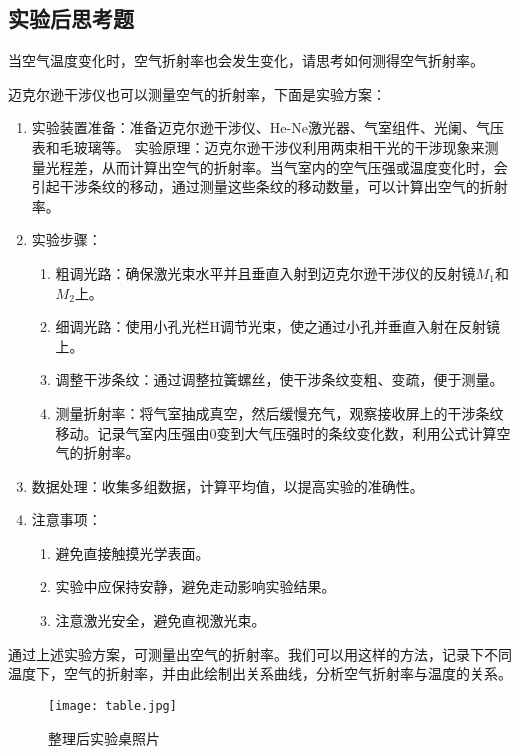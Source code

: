 \documentclass[dvipsnames, svgnames,a4paper,11pt]{article}
\begin{document}
			
			
			
\subsection{实验后思考题}



\begin{question}
	当空气温度变化时，空气折射率也会发生变化，请思考如何测得空气折射率。
\end{question}
	
	迈克尔逊干涉仪也可以测量空气的折射率，下面是实验方案：
	
	\begin{enumerate}
		\item 实验装置准备：准备迈克尔逊干涉仪、He-Ne激光器、气室组件、光阑、气压表和毛玻璃等。
		实验原理：迈克尔逊干涉仪利用两束相干光的干涉现象来测量光程差，从而计算出空气的折射率。当气室内的空气压强或温度变化时，会引起干涉条纹的移动，通过测量这些条纹的移动数量，可以计算出空气的折射率。
		\item 实验步骤：
		 	\begin{enumerate}[label=\roman*.]
				\item 粗调光路：确保激光束水平并且垂直入射到迈克尔逊干涉仪的反射镜$M_1$和$M_2$上。
				
				\item 细调光路：使用小孔光栏H调节光束，使之通过小孔并垂直入射在反射镜上。
				
				\item 调整干涉条纹：通过调整拉簧螺丝，使干涉条纹变粗、变疏，便于测量。
				
				\item 测量折射率：将气室抽成真空，然后缓慢充气，观察接收屏上的干涉条纹移动。记录气室内压强由0变到大气压强时的条纹变化数，利用公式计算空气的折射率。
			\end{enumerate}

		\item 数据处理：收集多组数据，计算平均值，以提高实验的准确性。
		 
		\item 注意事项：
			\begin{enumerate}[label=\roman*.]
				\item 避免直接触摸光学表面。
				\item 实验中应保持安静，避免走动影响实验结果。
				\item 注意激光安全，避免直视激光束。
			\end{enumerate}
	\end{enumerate}
	
	通过上述实验方案，可测量出空气的折射率。我们可以用这样的方法，记录下不同温度下，空气的折射率，并由此绘制出关系曲线，分析空气折射率与温度的关系。

	
	
	
	
	\begin{figure}[htbp]
		\centering
		\texttt{[image: table.jpg]}
		\caption{整理后实验桌照片}
		\label{fig:table}
	\end{figure}
	
\end{document}
